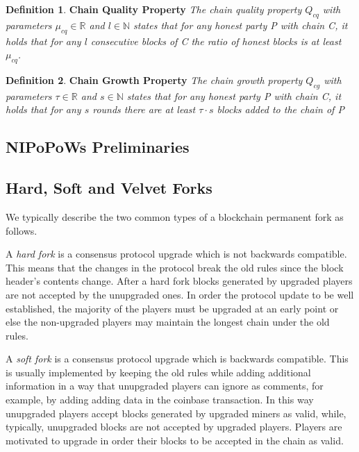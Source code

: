 \documentclass[10pt,a4paper]{article}
\theoremstyle{plain}
\theoremstyle{definition}
\newtheorem{defn}{Definition}
\theoremstyle{lemma}
\begin{document}
\begin{defn}{\textbf{Chain Quality Property}}
	\textit{The chain quality property $Q_{cq}$ with
parameters $\mu_{cq} \in \mathbb{R}$ and $l \in \mathbb{N}$ states that for any honest
party \textit{P} with chain \textit{C}, it holds that for any $l$ consecutive
blocks of \textit{C} the ratio of honest blocks is at least $\mu_{cq}$.}
	\label{defn:chain_quality}
\end{defn}

\begin{defn}{\textbf{Chain Growth Property}}
	\textit{The chain growth property $Q_{cg}$ with
parameters $\tau \in \mathbb{R}$ and $s \in \mathbb{N}$ states that for any honest party
\textit{P} with chain \textit{C}, it holds that for any $s$ rounds there are at least 
$\tau \cdot s$ blocks added to the chain of \textit{P}}
	\label{defn:chain_growth}
\end{defn}

\subsection{NIPoPoWs Preliminaries}

\subsection{Hard, Soft and Velvet Forks}
We typically describe the two common types of a blockchain permanent fork as follows.

A \textit{hard fork} is a consensus protocol upgrade which is not backwards
compatible. This means that the changes in the protocol break the old rules
since the block header's contents change. After a hard fork blocks generated
by upgraded players are not accepted by the unupgraded ones. In order the
protocol update to be well established, the majority of the players must be
upgraded at an early point or else the non-upgraded players may maintain the
longest chain under the old rules.

A \textit{soft fork} is a consensus protocol upgrade which is backwards compatible.
This is usually implemented by keeping the old rules while adding additional
information in a way that unupgraded players can ignore as comments, for example,
by adding adding data in the coinbase transaction. In this way unupgraded players
accept blocks generated by upgraded miners as valid, while, typically, unupgraded
blocks are not accepted by upgraded players. Players are motivated to upgrade in
order their blocks to be accepted in the chain as valid.
\end{document}
